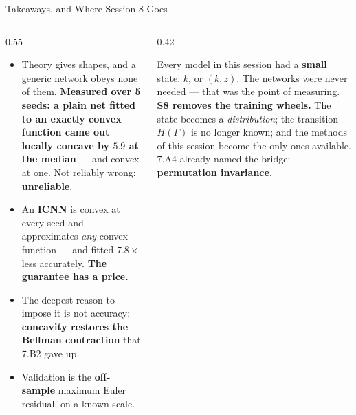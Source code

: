 \begin{frame}{Takeaways, and Where Session 8 Goes}
\begin{columns}[T]
\begin{column}{0.55\textwidth}
\begin{takeawaybox}\small
\begin{itemize}\small\setlength{\itemsep}{1.1mm}
  \item Theory gives shapes, and a generic network obeys none of them. \textbf{Measured over 5 seeds: a plain net fitted to an exactly convex function came out locally concave by $5.9$ at the median} --- and convex at one. Not reliably wrong: \textbf{unreliable}.
  \item An \textbf{ICNN} is convex at every seed and approximates \emph{any} convex function --- and fitted $\mathbf{7.8\times}$ less accurately. \textbf{The guarantee has a price.}
  \item The deepest reason to impose it is not accuracy: \textbf{concavity restores the Bellman contraction} that 7.B2 gave up.
  \item Validation is the \textbf{off-sample} maximum Euler residual, on a known scale.
\end{itemize}
\end{takeawaybox}
\end{column}
\begin{column}{0.42\textwidth}
\begin{conceptbox}[title=\textbf{Bridge to Session 8}]\small
Every model in this session had a \textbf{small} state: $k$, or $(k,z)$. The networks were never needed --- that was the point of measuring.
\medskip
\textbf{S8 removes the training wheels.} The state becomes a \emph{distribution}; the transition $H(\Gamma)$ is no longer known; and the methods of this session become the only ones available.
\medskip
7.A4 already named the bridge: \textbf{permutation invariance}.
\end{conceptbox}
\end{column}
\end{columns}
\end{frame}


